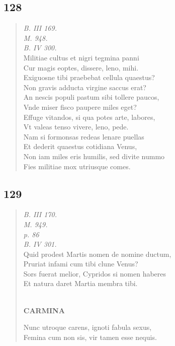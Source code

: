 \documentclass[11pt, a4paper]{report}
\begin{document}
            \subsection*{128}
      \begin{verse}
      \textit{B. III 169.} \\ \textit{M. 948.} \\ \textit{B. IV 300.} \\ Militiae cultus et nigri tegmina panni \\ Cur magis eoptes, dissere, leno, mihi. \\ Exiguosne tibi praebebat cellula quaestus? \\ Non gravis adducta virgine saccus erat? \\ An nescis populi pastum sibi tollere paucos, \\ Vnde miser fisco paupere miles eget? \\ Effuge vitandos, si qua potes arte, labores, \\ Vt valeas tenso vivere, leno, pede. \\ Nam si formonsas redeas lenare puellas \\ Et dederit quaestus cotidiana Venus, \\ Non iam miles eris humilis, sed divite nummo \\ Fies militiae mox utriusque comes. \\ 
      \end{verse}
  
            \subsection*{129}
      \begin{verse}
      \textit{B. III 170.} \\ \textit{M. 949.} \\ \textit{p. 86} \\ \textit{B. IV 301.} \\ Quid prodest Martis nomen de nomine ductum, \\ Pruriat infami cum tibi clune Venus? \\ Sors fuerat melior, Cypridos si nomen haberes \\ Et natura daret Martia membra tibi. \\ 
        ﻿\pagebreak 
     \marginpar{[138]} \begin{center} \textbf{CARMINA} \end{center}Nunc utroque carens, ignoti fabula sexus, \\ Femina cum non sis, vir tamen esse nequis. \\ 
      \end{verse}
  
\end{document}
